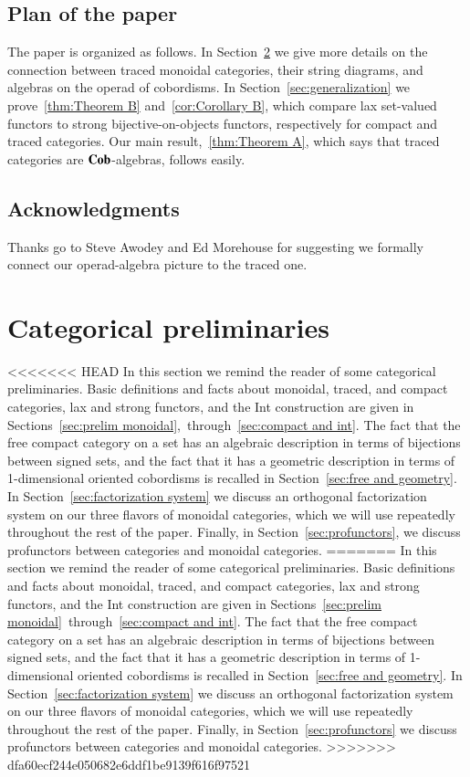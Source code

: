 \documentclass[12pt,oneside,article,draft]{memoir}
\begin{document}
\begin{enumerate}
\section{Plan of the paper}

The paper is organized as follows.
In Section~\ref{sec:traced categories} we give more details on the connection between traced monoidal categories, their string diagrams, and algebras on the operad of cobordisms.
In Section~\ref{sec:generalization} we prove~\ref{thm:Theorem B} and~\ref{cor:Corollary B}, which compare lax set-valued functors to strong bijective-on-objects functors, respectively for compact and traced categories.
Our main result,~\ref{thm:Theorem A}, which says that traced categories are $\mathbf{Cob}$-algebras, follows easily.

\section*{Acknowledgments}

Thanks go to Steve Awodey and Ed Morehouse for suggesting we formally connect our operad-algebra picture to the traced one. 


\chapter{Categorical preliminaries}\label{sec:traced categories}

<<<<<<< HEAD
In this section we remind the reader of some categorical preliminaries.
Basic definitions and facts about monoidal, traced, and compact categories, lax and strong functors, and the Int construction are given in Sections~\ref{sec:prelim monoidal},~through~\ref{sec:compact and int}.
The fact that the free compact category on a set has an algebraic description in terms of bijections between signed sets, and the fact that it has a geometric description in terms of 1-dimensional oriented cobordisms is recalled in Section~\ref{sec:free and geometry}.
In Section~\ref{sec:factorization system} we discuss an orthogonal factorization system on our three flavors of monoidal categories, which we will use repeatedly throughout the rest of the paper.
Finally, in Section~\ref{sec:profunctors}, we discuss profunctors between categories and monoidal categories.
=======
In this section we remind the reader of some categorical preliminaries. Basic definitions and facts about monoidal, traced, and compact categories, lax and strong functors, and the Int construction are given in Sections~\ref{sec:prelim monoidal}~through~\ref{sec:compact and int}. The fact that the free compact category on a set has an algebraic description in terms of bijections between signed sets, and the fact that it has a geometric description in terms of 1-dimensional oriented cobordisms is recalled in Section~\ref{sec:free and geometry}. In Section~\ref{sec:factorization system} we discuss an orthogonal factorization system on our three flavors of monoidal categories, which we will use repeatedly throughout the rest of the paper. Finally, in Section~\ref{sec:profunctors} we discuss profunctors between categories and monoidal categories.
>>>>>>> dfa60ecf244e050682e6ddf1be9139f616f97521


\end{enumerate}
\end{document}
